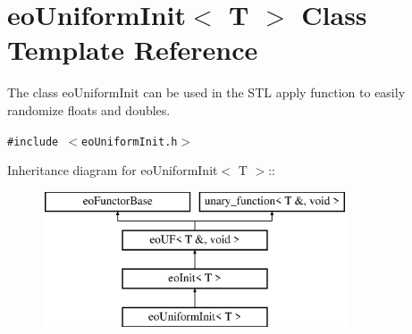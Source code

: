 \section{eo\-Uniform\-Init$<$ T $>$ Class Template Reference}
\label{classeo_uniform_init}
The class eo\-Uniform\-Init can be used in the STL apply function to easily randomize floats and doubles.  


{\tt \#include $<$eo\-Uniform\-Init.h$>$}

Inheritance diagram for eo\-Uniform\-Init$<$ T $>$::\begin{figure}[H]
\begin{center}
\leavevmode
\includegraphics[height=4cm]{classeo_uniform_init}
\end{center}
\end{figure}

